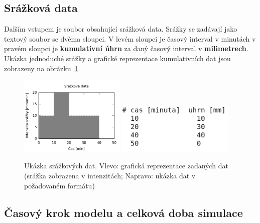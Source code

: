 \subsection{Srážková data} \label{sec:vstupsrazka}

Dalším vstupem je soubor obsahující srážková data. 
% 
% 
% 
Srážky se zadávají jako textový soubor se dvěma sloupci. V levém sloupci je časový interval v minutách v pravém sloupci je \textbf{kumulativní úhrn} za daný časový interval v \textbf{milimetrech}. Ukázka jednoduché srážky a grafické reprezentace kumulativních dat jsou zobrazeny na obrázku~\ref{fig:srazkovysoubor}. 
\begin{figure}
  \centering
  \includegraphics[width=0.45\textwidth]{./img/srazka-graf.png}
  \includegraphics[width=0.5\textwidth]{./img/srazka-soubor.png}
  \caption{Ukázka srážkových dat. Vlevo: grafická reprezentace zadaných dat (srážka zobrazena v intenzitách; Napravo: ukázka dat v požadovaném formátu)}
  \label{fig:srazkovysoubor}
\end{figure}














\subsection{Časový krok modelu a celková doba simulace} \label{sec:vstupkrok}

